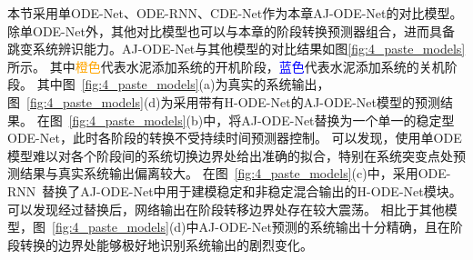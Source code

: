 本节采用单ODE-Net、ODE-RNN\cite{10.5555/3454287.3454765}、CDE-Net\cite{kidger2020neural}作为本章AJ-ODE-Net的对比模型。除单ODE-Net外，其他对比模型也可以与本章的阶段转换预测器组合，进而具备跳变系统辨识能力。AJ-ODE-Net与其他模型的对比结果如图\ref{fig:4_paste_models}所示。
其中\textcolor{orange}{橙色}代表水泥添加系统的开机阶段，\textcolor{blue}{蓝色}代表水泥添加系统的关机阶段。
其中图~\ref{fig:4_paste_models}(a)为真实的系统输出，图~\ref{fig:4_paste_models}(d)为采用带有H-ODE-Net的AJ-ODE-Net模型的预测结果。
在图~\ref{fig:4_paste_models}(b)中，将AJ-ODE-Net替换为一个单一的稳定型ODE-Net，此时各阶段的转换不受持续时间预测器控制。
可以发现，使用单ODE模型难以对各个阶段间的系统切换边界处给出准确的拟合，特别在系统突变点处预测结果与真实系统输出偏离较大。
在图~\ref{fig:4_paste_models}(c)中，采用ODE-RNN~\cite{10.5555/3454287.3454765}替换了AJ-ODE-Net中用于建模稳定和非稳定混合输出的H-ODE-Net模块。
可以发现经过替换后，网络输出在阶段转移边界处存在较大震荡。
相比于其他模型，图~\ref{fig:4_paste_models}(d)中AJ-ODE-Net预测的系统输出十分精确，且在阶段转换的边界处能够极好地识别系统输出的剧烈变化。
